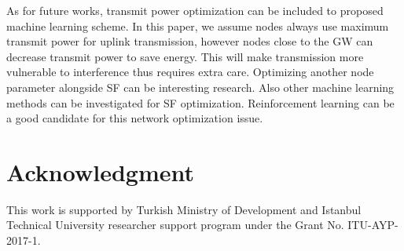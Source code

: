 \documentclass[conference]{IEEEtran}
\begin{document}
\par As for future works, transmit power optimization can be included to proposed machine learning scheme. In this paper, we assume nodes always use maximum transmit power for uplink transmission, however nodes close to the GW can decrease transmit power to save energy. This will make transmission more vulnerable to interference thus requires extra care. Optimizing another node parameter alongside SF can be interesting research. Also other machine learning methods can be investigated for SF optimization. Reinforcement learning can be a good candidate for this network optimization issue.



\section*{Acknowledgment}
\par This work is supported by Turkish Ministry of Development and Istanbul Technical University researcher support program under the Grant No. ITU-AYP-2017-1.




\end{document}
